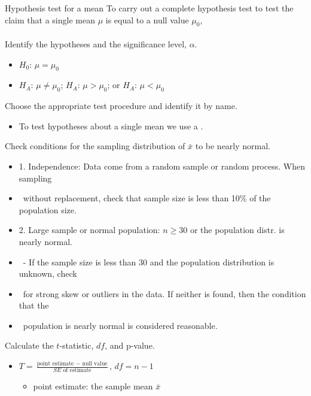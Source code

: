 \begin{onebox}{Hypothesis test for a mean}
To carry out a complete hypothesis test to test the claim that a single mean $\mu$ is equal to a null value $\mu_0$,
\\
\\
 Identify the hypotheses and the significance level, $\alpha$.\vspace{-1mm}
\begin{itemize}
\setlength{\itemsep}{0mm}
\item[] $H_0$: $\mu = \mu_0$  
\item[]  $H_A$: $\mu \ne \mu_0$;  \quad $H_A$: $\mu > \mu_0$; \quad or \quad $H_A$: $\mu < \mu_0$ 
\end{itemize} 
 Choose the appropriate test procedure and identify it by name. \vspace{-1mm}
\begin{itemize}
\item[] To test hypotheses about a single mean we use a .
\end{itemize}
  Check conditions for the sampling distribution of $\bar{x}$ to be nearly normal.\vspace{-1mm}
\begin{itemize}
\setlength{\itemsep}{0mm}
\item[] 1.  Independence:  Data come from a random sample or random process.  When sampling 
\item[] \quad \ without replacement, check that sample size is less than 10\% of the population size.
\item[] 2. Large sample or normal population:  $n\ge 30$ or the population distr. is nearly normal.
\item[] \quad \ - If the sample size is less than 30 and the population distribution is unknown, check 
\item[] \quad \ for strong skew or outliers in the data.  If neither is found, then the condition that the 
\item[] \quad \ population is nearly normal is considered reasonable.  
\end{itemize}
  Calculate the $t$-statistic, $df$, and p-value.
\begin{itemize}
\item[] $T = \frac{\text{point estimate } - \text{ null value}}{SE \text{ of estimate}}$,  \quad $df=n-1$
\begin{itemize}
\item[] point estimate:  the sample mean $\bar{x}$

\end{itemize}
\end{itemize}
\end{onebox}
